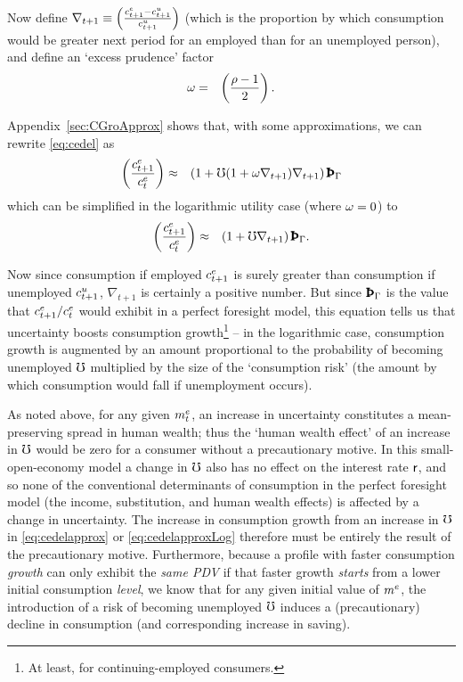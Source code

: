 \message{ !name(TractableBufferStock.tex)}\documentclass{handout}
\begin{document}


Now define $\nabla _{t+1} \equiv
\left(\frac{c^{e}_{t+1}-c^{u}_{t+1}}{c^{u}_{t+1}}\right)$ (which is
the proportion by which consumption would
be greater next period for an employed than for an 
unemployed person), and define an `excess prudence' factor
\begin{eqnarray}
  \omega & = & \left(\frac{\rho-1}{2}\right).
\end{eqnarray}

Appendix~\ref{sec:CGroApprox} shows that, with some approximations, we can rewrite \eqref{eq:cedel} as
\begin{eqnarray}
         \left(\frac{\cRatE_{t+1}}{\cRatE_{t}}\right) & \approx & \left(1+ \urate (1+\prudEx\nabla _{t+1})\nabla _{t+1}\right) {\PatPGro}
         \label{eq:cedelapprox}
\end{eqnarray}
which can be simplified in the logarithmic utility case (where $\omega = 0$) to
\begin{eqnarray}
         \left(\frac{\cRatE_{t+1}}{\cRatE_{t}}\right) & \approx & \left(1+ \urate \nabla _{t+1}\right) {\PatPGro} \label{eq:cedelapproxLog}. 
\end{eqnarray}

Now since consumption if employed $c^{e}_{t+1}$ is surely greater than
consumption if unemployed $c^{u}_{t+1}$, $\nabla _{t+1}$ is
certainly a positive number.  But since ${\PatPGro}$ is the
value that $c^{e}_{t+1}/c^{e}_{t}$ would exhibit in a perfect
foresight model, this equation tells us that uncertainty boosts
consumption growth\footnote{At least, for continuing-employed consumers.} -- in the logarithmic
case, consumption growth is augmented by an amount
proportional to the probability of becoming unemployed $\mho$ multiplied
by the size of the `consumption risk' (the amount by which consumption
would fall if unemployment occurs).


As noted above, for any given $m^{e}_{t}$, an increase in uncertainty
constitutes a mean-preserving spread in human wealth; thus the `human
wealth effect' of an increase in $\mho$ would be zero for a consumer
without a precautionary motive.  In this small-open-economy model a
change in $\mho$ also has no effect on the interest rate $\mathsf{r}$,
and so none of the conventional determinants of consumption in the
perfect foresight model (the income, substitution, and human wealth
effects) is affected by a change in uncertainty.  The increase in consumption
growth from an increase in $\mho$ in
\eqref{eq:cedelapprox} or \eqref{eq:cedelapproxLog} therefore must be
entirely the result of the precautionary motive.  Furthermore, because 
a profile with faster consumption {\it growth} can only exhibit the {\it same PDV} if that faster growth 
{\it starts} from a lower initial consumption {\it level}, we know that for any given initial value of $m^{e}$, the introduction of a risk
of becoming unemployed $\mho$ induces a (precautionary) decline in consumption (and corresponding increase in
saving).
\end{document}
